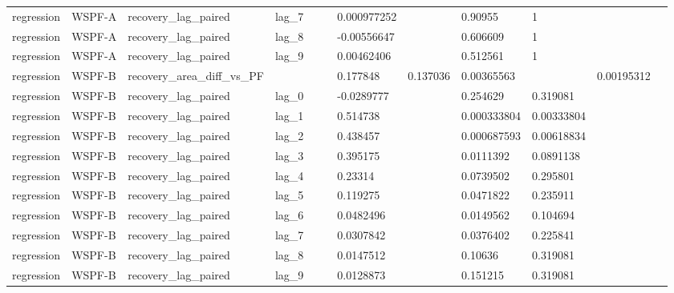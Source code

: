 \begin{tabular}{llllllllllll}
regression & WSPF-A & recovery\_lag\_paired & lag\_7 &  &  & 0.000977252 &  & 0.90955 & 1 &  &  \\
regression & WSPF-A & recovery\_lag\_paired & lag\_8 &  &  & -0.00556647 &  & 0.606609 & 1 &  &  \\
regression & WSPF-A & recovery\_lag\_paired & lag\_9 &  &  & 0.00462406 &  & 0.512561 & 1 &  &  \\
regression & WSPF-B & recovery\_area\_diff\_vs\_PF &  &  &  & 0.177848 & 0.137036 & 0.00365563 &  & 0.00195312 &  \\
regression & WSPF-B & recovery\_lag\_paired & lag\_0 &  &  & -0.0289777 &  & 0.254629 & 0.319081 &  &  \\
regression & WSPF-B & recovery\_lag\_paired & lag\_1 &  &  & 0.514738 &  & 0.000333804 & 0.00333804 &  &  \\
regression & WSPF-B & recovery\_lag\_paired & lag\_2 &  &  & 0.438457 &  & 0.000687593 & 0.00618834 &  &  \\
regression & WSPF-B & recovery\_lag\_paired & lag\_3 &  &  & 0.395175 &  & 0.0111392 & 0.0891138 &  &  \\
regression & WSPF-B & recovery\_lag\_paired & lag\_4 &  &  & 0.23314 &  & 0.0739502 & 0.295801 &  &  \\
regression & WSPF-B & recovery\_lag\_paired & lag\_5 &  &  & 0.119275 &  & 0.0471822 & 0.235911 &  &  \\
regression & WSPF-B & recovery\_lag\_paired & lag\_6 &  &  & 0.0482496 &  & 0.0149562 & 0.104694 &  &  \\
regression & WSPF-B & recovery\_lag\_paired & lag\_7 &  &  & 0.0307842 &  & 0.0376402 & 0.225841 &  &  \\
regression & WSPF-B & recovery\_lag\_paired & lag\_8 &  &  & 0.0147512 &  & 0.10636 & 0.319081 &  &  \\
regression & WSPF-B & recovery\_lag\_paired & lag\_9 &  &  & 0.0128873 &  & 0.151215 & 0.319081 &  &  \\
\hline
\end{tabular}
